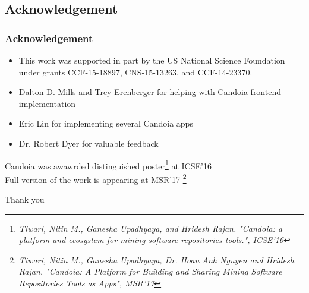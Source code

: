     \subsection{Acknowledgement}
        \begin{frame}
            \frametitle{Acknowledgement}
            \begin{itemize}
                \item This work was supported in part by the US National Science Foundation under grants CCF-15-18897, CNS-15-13263, and CCF-14-23370.
                \item  Dalton D. Mills and Trey Erenberger for helping with Candoia frontend implementation
                \item Eric Lin for implementing several Candoia apps
                \item Dr. Robert Dyer for valuable feedback
            \end{itemize}
        \end{frame}


        \begin{frame}
        \centering
            Candoia was awawrded distinguished poster\footnote{\tiny{\emph{Tiwari, Nitin M., Ganesha Upadhyaya, and Hridesh Rajan.
            "Candoia: a platform and ecosystem for mining software repositories tools.",
            ICSE'16}}}  at ICSE'16 \\

            \vspace{1cm}
            Full version of the work is appearing at MSR'17
             \footnote{\tiny{\emph{Tiwari, Nitin M., Ganesha Upadhyaya, Dr. Hoan Anh Nguyen and Hridesh Rajan.
                "Candoia: A Platform for Building and Sharing Mining Software Repositories Tools as Apps", MSR'17}}} \\
        \end{frame}

        \begin{frame}
            \centering
            Thank you
        \end{frame}


